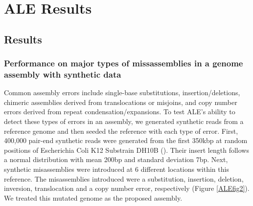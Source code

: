 \documentclass[phd,tocprelim]{cornell}
\begin{document}


\chapter{ALE Results} %
\label{cha:ALE Results}

\section{Results}

\subsection{Performance on major types of missassemblies in a genome assembly with synthetic data}
Common assembly errors include single-base substitutions, insertion/deletions, chimeric assemblies derived from translocations or misjoins, and copy number errors derived from repeat condensation/expansions. To test ALE's ability to detect these types of errors in an assembly, we generated synthetic reads from a reference genome and then seeded the reference with each type of error. First, 400,000 pair-end synthetic reads were generated from the first 350kbp at random positions of Escherichia Coli K12 Substrain DH10B (\cite{Durfee2008}). Their insert length follows a normal distribution with mean 200bp and standard deviation 7bp. Next, synthetic misassemblies were introduced at 6 different locations within this reference.  The misassemblies introduced were a substitution, insertion, deletion, inversion, translocation and a copy number error, respectively (Figure \ref{ALEfig2}). We treated this mutated genome as the proposed assembly.
\end{document}
